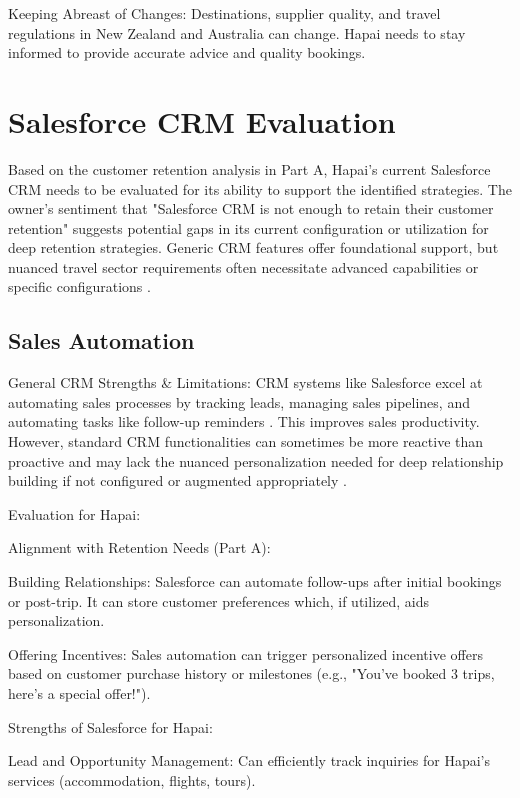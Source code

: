 \documentclass{article}
\begin{document}
Keeping Abreast of Changes: Destinations, supplier quality, and travel regulations in New Zealand and Australia can change. Hapai needs to stay informed to provide accurate advice and quality bookings.

\section{Salesforce CRM Evaluation} 

Based on the customer retention analysis in Part A, Hapai's current Salesforce CRM needs to be evaluated for its ability to support the identified strategies. The owner's sentiment that "Salesforce CRM is not enough to retain their customer retention" suggests potential gaps in its current configuration or utilization for deep retention strategies. Generic CRM features offer foundational support, but nuanced travel sector requirements often necessitate advanced capabilities or specific configurations \cite{commerce_shri_v_r_patel_college_of_commerce_mehsana_impact_2024}.

\subsection{Sales Automation}

General CRM Strengths \& Limitations:
CRM systems like Salesforce excel at automating sales processes by tracking leads, managing sales pipelines, and automating tasks like follow-up reminders \cite{pookandy_enhancing_nodate,commerce_shri_v_r_patel_college_of_commerce_mehsana_impact_2024}. This improves sales productivity. However, standard CRM functionalities can sometimes be more reactive than proactive and may lack the nuanced personalization needed for deep relationship building if not configured or augmented appropriately \cite{ayub_artificial_2025}.

Evaluation for Hapai:

Alignment with Retention Needs (Part A):

Building Relationships: Salesforce can automate follow-ups after initial bookings or post-trip. It can store customer preferences which, if utilized, aids personalization.

Offering Incentives: Sales automation can trigger personalized incentive offers based on customer purchase history or milestones (e.g., "You've booked 3 trips, here's a special offer!").

Strengths of Salesforce for Hapai:

Lead and Opportunity Management: Can efficiently track inquiries for Hapai’s services (accommodation, flights, tours).
\end{document}
